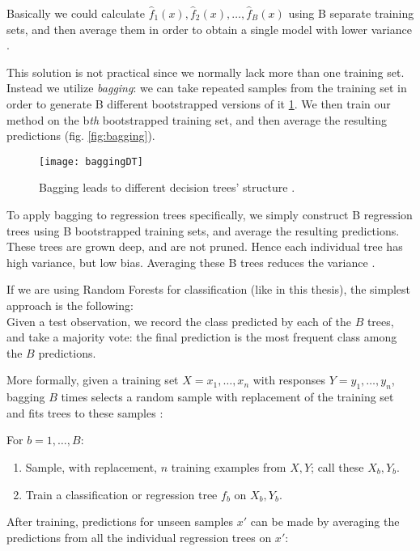 Basically we could calculate $\hat{f}_1(x), \hat{f}_2(x), \dots, \hat{f}_B(x)$ using B separate training sets, and then average them in order to obtain a single model with lower variance \cite{ISLR}.

This solution is not practical since we normally lack more than one training set. \\
Instead we utilize \textit{bagging}: we can take repeated samples from the training set in order to generate B different bootstrapped versions of it \ref{fig:baggingDT}. We then train our method on the b\textit{th} bootstrapped training set, and then average the resulting predictions (fig. \ref{fig:bagging}).

\begin{figure}[H]
	\centering
	\texttt{[image: baggingDT]}
	\caption{Bagging leads to different decision trees' structure \cite{baggingDT}.}
	\label{fig:baggingDT}
\end{figure}

To apply bagging to regression trees specifically, we simply construct B regression trees using B bootstrapped training sets, and average the resulting predictions. These trees are grown deep, and are not pruned. Hence each individual tree has high variance, but low bias. Averaging these B trees reduces the variance \cite{ISLR}.

If we are using Random Forests for classification (like in this thesis), the simplest approach is the following: \\
Given a test observation, we record the class predicted by each of the $B$ trees, and take a majority vote: the final prediction is the most frequent class among the $B$ predictions.

More formally, given a training set $X = x_1, \dots, x_n$ with responses $Y = y_1, \dots, y_n$, bagging $B$ times selects a random sample with replacement of the training set and fits trees to these samples \cite{wiki:randomforest}:

For $b = 1, \dots, B$:
\begin{enumerate}[noitemsep]
	\item Sample, with replacement, $n$ training examples from $X, Y$; call these $X_b, Y_b$.
	\item Train a classification or regression tree $f_b$ on $X_b, Y_b$.
\end{enumerate}

After training, predictions for unseen samples $x'$ can be made by averaging the predictions from all the individual regression trees on $x'$:

